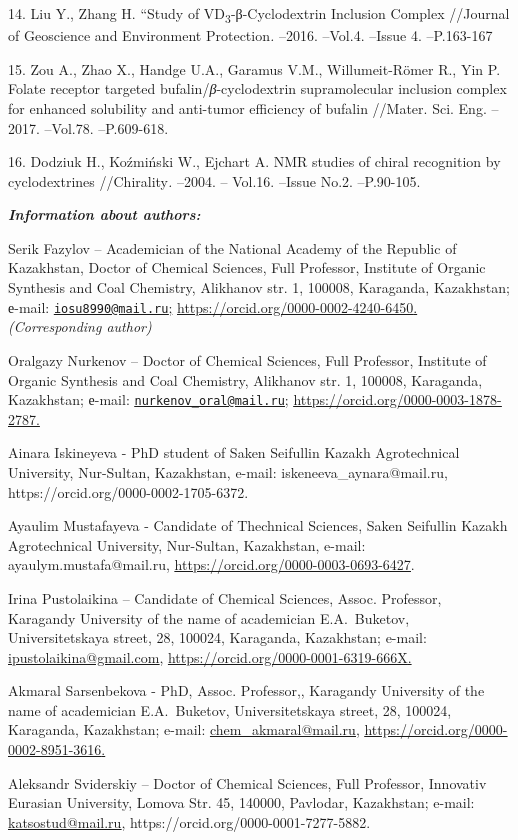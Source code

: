 14. Liu Y., Zhang H. ``Study of VD\textsubscript{3}-β-Cyclodextrin
Inclusion Complex //Journal of Geoscience and Environment
Protection\emph{.} --2016. --Vol.4. --Issue 4. --P.163-167

15. Zou A., Zhao X., Handge U.A., Garamus V.M., Willumeit-Römer R., Yin
P. Folate receptor targeted bufalin/\emph{β}-cyclodextrin supramolecular
inclusion complex for enhanced solubility and anti-tumor efficiency of
bufalin //Mater. Sci. Eng. --2017. --Vol.78. --P.609-618.

16. Dodziuk H., Koźmiński W., Ejchart A. NMR studies of chiral
recognition by cyclodextrines //Chirality\emph{.} --2004. -- Vol.16.
--Issue No.2. --P.90-105.

\emph{{\bfseries Information about authors:}}

Serik Fazylov -- Academician of the National Academy of the Republic of
Kazakhstan, Doctor of Chemical Sciences, Full Professor, Institute of
Organic Synthesis and Coal Chemistry, Alikhanov str. 1, 100008,
Karaganda, Kazakhstan; е-mail:
\ul{\href{mailto:iosu8990@mail.ru}{\nolinkurl{iosu8990@mail.ru}};}
\ul{\url{https://orcid.org/0000-0002-4240-6450}.} \emph{(Corresponding
author)}

Oralgazy Nurkenov -- Doctor of Chemical Sciences, Full Professor,
Institute of Organic Synthesis and Coal Chemistry, Alikhanov str. 1,
100008, Karaganda, Kazakhstan; е-mail:
\ul{\href{mailto:nurkenov_oral@mail.ru}{\nolinkurl{nurkenov\_oral@mail.ru}};}
\ul{\url{https://orcid.org/0000-0003-1878-2787}.}

Ainara Iskineyeva - PhD student of Saken Seifullin Kazakh Agrotechnical
University, Nur-Sultan, Kazakhstan, e-mail: iskeneeva\_aynara@mail.ru,
https://orcid.org/0000-0002-1705-6372.

Ayaulim Mustafayeva - Candidate of Thechnical Sciences, Saken Seifullin
Kazakh Agrotechnical University, Nur-Sultan, Kazakhstan, e-mail:
ayaulym.mustafa@mail.ru,
\href{https://orcid.org/0000-0003-0693-6427}{\ul{https://orcid.org/0000-0003-0693-6427}}.

Irina Pustolaikina -- Candidate of Chemical Sciences, Assoc. Professor,
Karagandy University of the name of academician E.A.~Buketov,
Universitetskaya street, 28, 100024, Karaganda, Kazakhstan; e-mail:
\href{mailto:ipustolaikina@gmail.com}{\ul{ipustolaikina@gmail.com}},
\ul{\url{https://orcid.org/0000-0001-6319-666X}.}

Akmaral Sarsenbekova - PhD, Assoc. Professor,, Karagandy University of
the name of academician E.A.~Buketov, Universitetskaya street, 28,
100024, Karaganda, Kazakhstan; e-mail:
\href{mailto:chem_akmaral@mail.ru}{\ul{chem\_akmaral@mail.ru}},
\ul{\url{https://orcid.org/0000-0002-8951-3616}.}

Aleksandr Sviderskiy -- Doctor of Chemical Sciences, Full Professor,
Innovativ Eurasian University, Lomova Str. 45, 140000, Pavlodar,
Kazakhstan; e-mail:
\href{mailto:katsostud@mail.ru}{\ul{katsostud@mail.ru}},
https://orcid.org/0000-0001-7277-5882.

